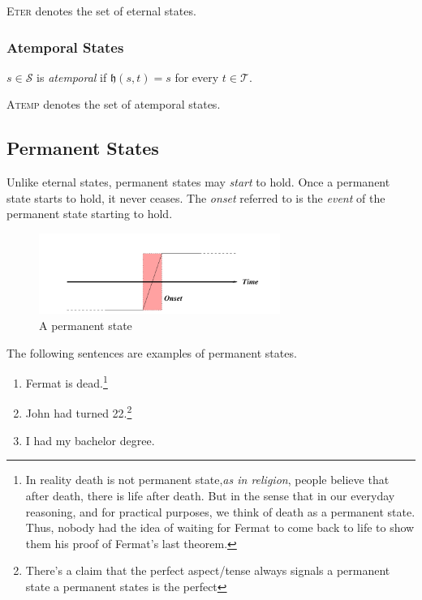 \textsc{Eter} denotes the set of eternal states.

\subsubsection{Atemporal States}
\begin{defn}
  $s \in \mathcal{S}$ is \textit{atemporal} if $\mathfrak{h}(s, t) = s$ for every $t \in \mathcal{T}$.
\end{defn}
\textsc{Atemp} denotes the set of atemporal states.
\subsection{Permanent States}
Unlike eternal states, permanent states may \textit{start} to hold. Once a permanent state starts to hold, it
never ceases. The \textit{onset} referred to is the \textit{event} of the permanent state starting to hold.

\begin{figure}[H]
  \centering
  \includegraphics[width=0.7\textwidth]{images/permanent-states.png}
  \caption{A permanent state}
  \label{fig:permanent}
\end{figure}

The following sentences are examples of permanent states.


\begin{enumerate}
  \item Fermat is dead.\footnote{In reality death is not permanent state,\textit{as in religion}, people believe that after death, there is life after death.
          But in the sense that in our everyday reasoning, and for practical purposes, we think of death as a permanent state.
          Thus, nobody had the idea of waiting for Fermat to come back to life to show them his proof of Fermat’s last theorem.}
  \item John had turned 22.\footnote{There's a claim that the perfect aspect/tense always signals a permanent state a permanent states is the perfect}
  \item I had my bachelor degree.
\end{enumerate}

